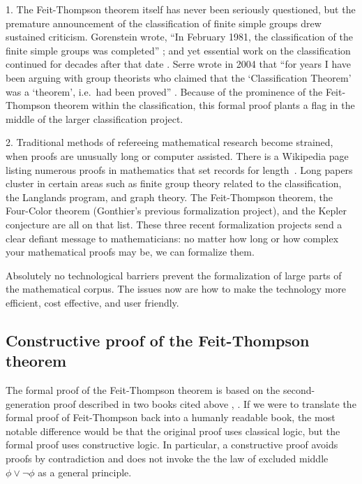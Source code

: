 \documentclass[brochure,english,12pt]{bourbaki}
\theoremstyle{plain}
\begin{document}
1. The Feit-Thompson theorem itself has never been seriously questioned,
but the premature announcement of the classification of finite simple groups drew sustained criticism.
 Gorenstein wrote, ``In February 1981, the classification of the finite simple groups was
completed'' \cite[page 1]{gorenstein2007finite}; and yet essential work on the classification
continued for decades after that date \cite{aschbacher2004status}. 
Serre wrote in 2004 that ``for years I have been arguing with group theorists who claimed
that the `Classification Theorem' was a `theorem', i.e.\ had been proved'' \cite{raussen2004interview}.
Because of the prominence of the Feit-Thompson theorem within the classification, 
this formal proof plants a flag in the middle of the larger classification project.




2. Traditional methods of refereeing mathematical research become strained, when
proofs are unusually long or computer assisted.  There is a Wikipedia page listing numerous proofs
in mathematics that set records for length~\cite{WikiLong}.
Long papers cluster in certain areas
such as finite group theory related to the classification, 
the Langlands program,
and graph theory.  The Feit-Thompson theorem, the Four-Color theorem (Gonthier's previous formalization
project), and the Kepler conjecture are all on that list. 
These three recent formalization projects send a clear defiant message  to mathematicians:
no matter how long or how complex your mathematical proofs may be, we can formalize them.

Absolutely no technological barriers 
prevent the formalization of large parts of the mathematical corpus.  The issues now
are how to make the technology more efficient, cost effective, and user friendly.

\subsection{Constructive proof of the Feit-Thompson theorem}

The formal proof of the Feit-Thompson theorem is based on the second-generation proof described in
two books cited above \cite{bender1994local},  \cite{peterfalvi2000character}.
If we were to translate the formal proof of Feit-Thompson back into a humanly readable book, 
the most notable difference would be that the original proof uses classical logic,
but the formal proof uses constructive logic.  In particular, a constructive proof avoids proofs by contradiction
and does not invoke the
 the law of excluded middle $\phi\lor \neg \phi$ as a general principle.
\end{document}
